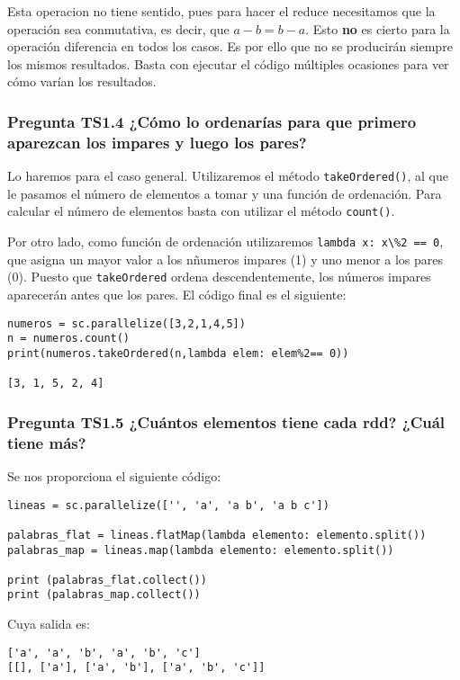 \documentclass[11pt]{article}
\def\inline{\lstinline[basicstyle=\ttfamily,keywordstyle={}]}
\begin{document}
Esta operacion no tiene sentido, pues para hacer el reduce necesitamos que la operación sea conmutativa, es decir, que $a-b = b-a$. Esto \textbf{no} es cierto para la operación diferencia en todos los casos. Es por ello que no se producirán siempre los mismos resultados. Basta con ejecutar el código múltiples ocasiones para ver cómo varían los resultados.

\subsubsection*{ Pregunta TS1.4 ¿Cómo lo ordenarías para que primero aparezcan los impares y luego los pares?}

Lo haremos para el caso general. Utilizaremos el método \inline{takeOrdered()}, al que le pasamos el número de elementos a tomar y una función de ordenación. Para calcular el número de elementos basta con utilizar el método \inline{count()}.

Por otro lado, como función de ordenación utilizaremos \inline{lambda x: x\%2 == 0}, que asigna un mayor valor a los nñumeros impares (1) y uno menor a los pares (0). Puesto que \inline{takeOrdered} ordena descendentemente, los números impares aparecerán antes que los pares. El código final es el siguiente:

\begin{verbatim}
numeros = sc.parallelize([3,2,1,4,5])
n = numeros.count()
print(numeros.takeOrdered(n,lambda elem: elem%2== 0))

[3, 1, 5, 2, 4]
\end{verbatim}

\subsubsection*{ Pregunta TS1.5 ¿Cuántos elementos tiene cada rdd? ¿Cuál tiene más? }

Se nos proporciona el siguiente código:

\begin{verbatim}
lineas = sc.parallelize(['', 'a', 'a b', 'a b c'])

palabras_flat = lineas.flatMap(lambda elemento: elemento.split())
palabras_map = lineas.map(lambda elemento: elemento.split())

print (palabras_flat.collect())
print (palabras_map.collect())
\end{verbatim}

Cuya salida es:

\begin{verbatim}
['a', 'a', 'b', 'a', 'b', 'c']
[[], ['a'], ['a', 'b'], ['a', 'b', 'c']]
\end{verbatim}
\end{document}
